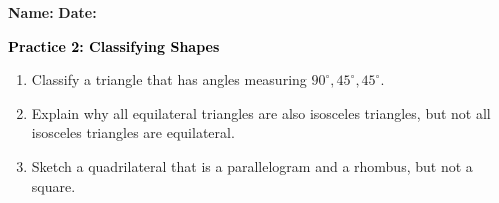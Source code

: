 \documentclass[12pt, letterpaper, fleqn]{article}
\begin{document}
\textbf{Name:} \underline{\hspace{5cm}}
\hfill
\textbf{Date:} \underline{\hspace{3cm}}\\

\begin{tcolorbox}[colback=customteal!20]
    \large\textcolor{black}{\textbf{Practice 2: Classifying Shapes}}
\end{tcolorbox}
\begin{enumerate}[itemsep=3.5cm, leftmargin=0.6cm]
\item Classify a triangle that has angles measuring $90^\circ, 45^\circ, 45^\circ$.
\vspace{3.5cm}
\item Explain why all equilateral triangles are also isosceles triangles, but not all isosceles triangles are equilateral.
\vspace{3.5cm}
\item Sketch a quadrilateral that is a parallelogram and a rhombus, but not a square.
\end{enumerate}
\end{document}

